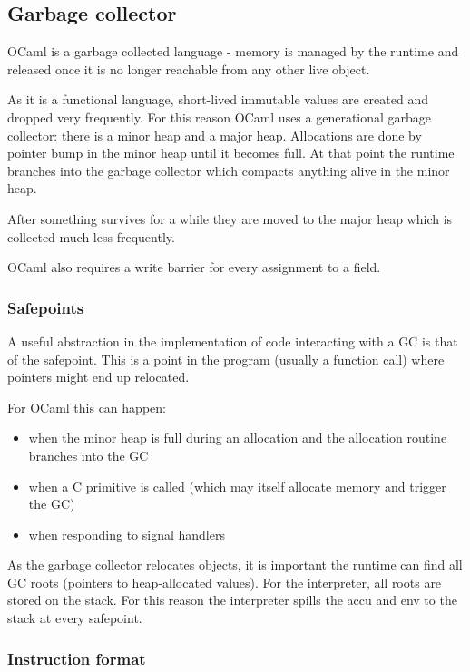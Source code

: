 \subsection{Garbage collector}

OCaml is a garbage collected language - memory is managed by the runtime and released once it is
no longer reachable from any other live object.

As it is a functional language, short-lived immutable values are created and dropped very
frequently. For this reason
OCaml uses a generational garbage collector: there is a minor heap and a major heap. Allocations
are done by pointer bump in the minor heap
until it becomes full. At that point the runtime branches into the garbage collector which compacts
anything alive in the minor heap.

After something survives for a while they are moved to the major heap which is collected much less
frequently.

OCaml also requires a write barrier for every assignment to a field.

\subsubsection{Safepoints}

A useful abstraction in the implementation of code interacting with a GC is that of the safepoint.
This is a point in the program (usually a function call) where pointers might end up relocated.

For OCaml this can happen:

\begin{itemize}
    \item when the minor heap is full during an allocation and the allocation routine branches into
          the
          GC
    \item when a C primitive is called	(which may itself allocate memory and trigger the GC)
    \item when responding to signal handlers
\end{itemize}

As the garbage collector relocates objects, it is important the runtime can find all GC roots
(pointers to heap-allocated values). For the interpreter, all roots are stored on the stack. For
this reason the interpreter spills the accu and env to the stack at every safepoint.

\subsubsection{Instruction format}

